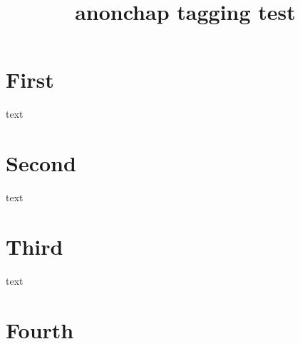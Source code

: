 \documentclass{book}
\title{anonchap tagging test}
\begin{document}
\simplechapter
\chapter{First}
text
\renewcommand{\simplechapterdelim}{:}
\chapter{Second}
text
\restorechapter %
\simplechapter[Chap]
\chapter{Third}
text
\restorechapter
\chapter{Fourth}
\end{document}
